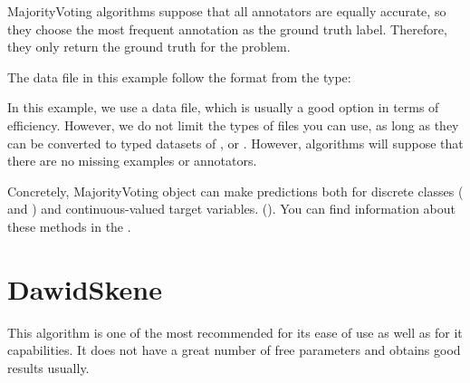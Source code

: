 \documentclass[letterpaper,10pt,english]{sphinxmanual}
\begin{document}
MajorityVoting algorithms suppose that all annotators are equally accurate, so they choose the
most frequent annotation as the ground truth label. Therefore, they only return the ground
truth for the problem.

The data file in this example follow the format from the  type:

%
\begin{sphinxVerbatim}[commandchars=\\\{\}]
  
                    
                    
                    
\end{sphinxVerbatim}

In this example, we use a  data file, which is usually a good option in terms of
efficiency. However, we do not limit the types of files you can use, as long as they can be
converted to typed datasets of ,  or .
However, algorithms will suppose that there are no missing examples or annotators.

Concretely, MajorityVoting object can make predictions both for discrete classes ( and
) and continuous-valued target variables. (). You can find
information about these methods in the .


\section{DawidSkene}
\label{\detokenize{usage/examples:dawidskene}}
This algorithm is one of the most recommended for its ease of use as well as for it capabilities. It does not
have a great number of free parameters and obtains good results usually.
\end{document}
